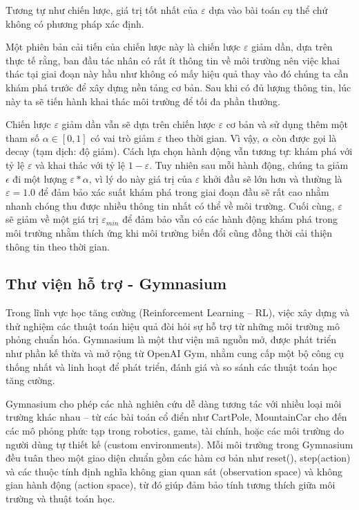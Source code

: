 Tương tự như chiến lược, giá trị tốt nhất của $\varepsilon$ dựa vào bài toán cụ thể chứ không có phương pháp xác định.

Một phiên bản cải tiến của chiến lược này là chiến lược $\varepsilon$ giảm dần, dựa trên thực tế rằng, ban đầu tác nhân có rất ít thông tin về môi trường nên việc khai thác tại giai đoạn này hầu như không có mấy hiệu quả thay vào đó chúng ta cần khám phá trước để xây dựng nền tảng cơ bản. Sau khi có đủ lượng thông tin, lúc này ta sẽ tiến hành khai thác môi trường để tối đa phần thưởng.

Chiến lược $\varepsilon$ giảm dần vẫn sẽ dựa trên chiến lược $\varepsilon$ cơ bản và sử dụng thêm một tham số $\alpha \in [0, 1]$ có vai trò giảm $\varepsilon$ theo thời gian. Vì vậy, $\alpha$ còn được gọi là decay (tạm dịch: độ giảm). Cách lựa chọn hành động vẫn tương tự: khám phá với tỷ lệ $\varepsilon$ và khai thác với tỷ lệ $1 - \varepsilon$. Tuy nhiên sau mỗi hành động, chúng ta giảm $\epsilon$ đi một lượng $\varepsilon * \alpha$, vì lý do này giá trị của $\varepsilon$ khởi đầu sẽ lớn hơn và thường là $\varepsilon = 1.0$ để đảm bảo xác suất khám phá trong giai đoạn đầu sẽ rất cao nhằm nhanh chóng thu được nhiều thông tin nhất có thể về môi trường. Cuối cùng, $\varepsilon$ sẽ giảm về một giá trị $\varepsilon_{min}$ để đảm bảo vẫn có các hành động khám phá trong môi trường nhằm thích ứng khi môi trường biến đổi cũng đồng thời cải thiện thông tin theo thời gian.

\subsection{Thư viện hỗ trợ - Gymnasium}

Trong lĩnh vực học tăng cường (Reinforcement Learning – RL), việc xây dựng và thử nghiệm các thuật toán hiệu quả đòi hỏi sự hỗ trợ từ những môi trường mô phỏng chuẩn hóa. Gymnasium là một thư viện mã nguồn mở, được phát triển như phần kế thừa và mở rộng từ OpenAI Gym, nhằm cung cấp một bộ công cụ thống nhất và linh hoạt để phát triển, đánh giá và so sánh các thuật toán học tăng cường.

Gymnasium cho phép các nhà nghiên cứu dễ dàng tương tác với nhiều loại môi trường khác nhau – từ các bài toán cổ điển như CartPole, MountainCar cho đến các mô phỏng phức tạp trong robotics, game, tài chính, hoặc các môi trường do người dùng tự thiết kế (custom environments). Mỗi môi trường trong Gymnasium đều tuân theo một giao diện chuẩn gồm các hàm cơ bản như reset(), step(action) và các thuộc tính định nghĩa không gian quan sát (observation space) và không gian hành động (action space), từ đó giúp đảm bảo tính tương thích giữa môi trường và thuật toán học.